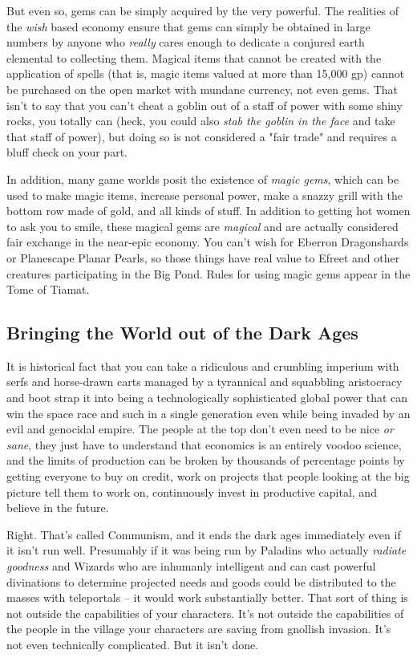 But even so, gems can be simply acquired by the very powerful. The realities of the \textit{wish} based economy ensure that gems can simply be obtained in large numbers by anyone who \textit{really} cares enough to dedicate a conjured earth elemental to collecting them. Magical items that cannot be created with the application of spells (that is, magic items valued at more than 15,000 gp) cannot be purchased on the open market with mundane currency, not even gems. That isn't to say that you can't cheat a goblin out of a staff of power with some shiny rocks, you totally can (heck, you could also \textit{stab the goblin in the face} and take that staff of power), but doing so is not considered a "fair trade" and requires a bluff check on your part.

In addition, many game worlds posit the existence of \textit{magic gems}, which can be used to make magic items, increase personal power, make a snazzy grill with the bottom row made of gold, and all kinds of stuff. In addition to getting hot women to ask you to smile, these magical gems are \textit{magical} and are actually considered fair exchange in the near-epic economy. You can't wish for Eberron Dragonshards or Planescape Planar Pearls, so those things have real value to Efreet and other creatures participating in the Big Pond. Rules for using magic gems appear in the Tome of Tiamat.

\subsection{Bringing the World out of the Dark Ages}

It is historical fact that you can take a ridiculous and crumbling imperium with serfs and horse-drawn carts managed by a tyrannical and squabbling aristocracy and boot strap it into being a technologically sophisticated global power that can win the space race and such in a single generation even while being invaded by an evil and genocidal empire. The people at the top don't even need to be nice \textit{or sane}, they just have to understand that economics is an entirely voodoo science, and the limits of production can be broken by thousands of percentage points by getting everyone to buy on credit, work on projects that people looking at the big picture tell them to work on, continuously invest in productive capital, and believe in the future.

Right. That's called Communism, and it ends the dark ages immediately even if it isn't run well. Presumably if it was being run by Paladins who actually \textit{radiate goodness} and Wizards who are inhumanly intelligent and can cast powerful divinations to determine projected needs and goods could be distributed to the masses with teleportals -- it would work substantially better. That sort of thing is not outside the capabilities of your characters. It's not outside the capabilities of the people in the village your characters are saving from gnollish invasion. It's not even technically complicated. But it isn't done.

